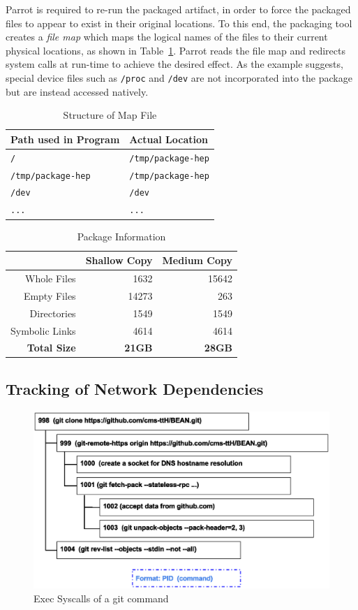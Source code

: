 \documentclass[procedia]{easychair}
\begin{document}
Parrot is required to re-run the packaged artifact, in order to force
the packaged files to appear to exist in their original locations.
To this end, the packaging tool creates a \emph{file map} which maps
the logical names of the files to their current physical locations, as shown in Table~\ref{table:map-file}.
Parrot reads the file map and redirects system calls at run-time to achieve the desired effect.
As the example suggests, special device files such as {\tt /proc} and {\tt /dev}
are not incorporated into the package but are instead accessed natively.

\begin{table}
    \centering
    \begin{tabular}{ll}
    \hline
    \bf Path used in Program & \bf Actual Location \\ \hline
    {\tt /} & {\tt /tmp/package-hep} \\ \hline
    {\tt /tmp/package-hep} & {\tt /tmp/package-hep} \\ \hline
    {\tt /dev} & {\tt /dev} \\ \hline
    {\tt ...} & {\tt ...}\\ \hline
    \end{tabular}
    \caption{Structure of Map File}
    \label{table:map-file}
\end{table}

\begin{table}
    \centering
    \begin{tabular}{rrr}
\hline
                    & \bf Shallow Copy & \bf Medium Copy\\
\hline
    Whole Files    & 1632         & 15642\\ 
\hline
    Empty Files    & 14273        & 263\\
\hline
    Directories    & 1549         & 1549\\ 
\hline
    Symbolic Links & 4614         & 4614 \\
\hline
    \bf Total Size & \bf 21GB     & \bf 28GB \\ 
\hline
    \end{tabular}
    \caption{Package Information}
    \label{table:package-info}
\end{table}

\subsection{Tracking of Network Dependencies}

\begin{figure}
\centering
\includegraphics[width=.6\textwidth]{git-syscall.eps}
\caption{Exec Syscalls of a git command}
\label{fig:git-syscall}
\end{figure}
\end{document}
